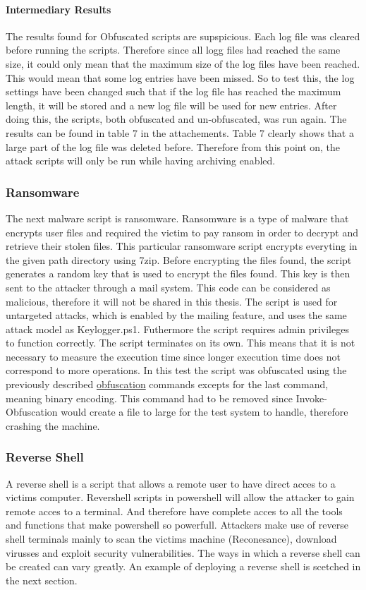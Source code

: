 \documentclass{article}%
\begin{document}
\paragraph{Intermediary Results}\hfill\newline
The results found for Obfuscated scripts are supspicious. Each log file was cleared before running the scripts. Therefore since all logg files had reached the same size, it could only mean that the maximum size of the log files have been reached. This would mean that some log entries have been missed. So to test this, the log settings have been changed such that if the log file has reached the maximum length, it will be stored and a new log file will be used for new entries. After doing this, the scripts, both obfuscated and un-obfuscated, was run again. The results can be found in table $7$ in the attachements. Table $7$ clearly shows that a large part of the log file was deleted before. Therefore from this point on, the attack scripts will only be run while having archiving enabled.

\subsubsection{Ransomware}
The next malware script is ransomware. Ransomware is a type of malware that encrypts user files and required the victim to pay ransom in order to decrypt and retrieve their stolen files. This particular ransomware script encrypts everyting in the given path directory using 7zip. Before encrypting the files found, the script generates a random key that is used to encrypt the files found. This key is then sent to the attacker through a mail system. This code can be considered as malicious, therefore it will not be shared in this thesis. The script is used for untargeted attacks, which is enabled by the mailing feature, and uses the same attack model as Keylogger.ps1. Futhermore the script requires admin privileges to function correctly. The script terminates on its own. This means that it is not necessary to measure the execution time since longer execution time does not correspond to more operations.
In this test the script was obfuscated using the previously described \hyperlink{obfuscation}{obfuscation} commands excepts for the last command, meaning binary encoding. This command had to be removed since Invoke-Obfuscation would create a file to large for the test system to handle, therefore crashing the machine.

\subsubsection{Reverse Shell}
A reverse shell is a script that allows a remote user to have direct acces to a victims computer. Revershell scripts in powershell will allow the attacker to gain remote acces to a terminal. And therefore have complete acces to all the tools and functions that make powershell so powerfull. Attackers make use of reverse shell terminals mainly to scan the victims machine (Reconesance), download virusses and exploit security vulnerabilities. The ways in which a reverse shell can be created can vary greatly. An example of deploying a reverse shell is scetched in the next section.
\end{document}
